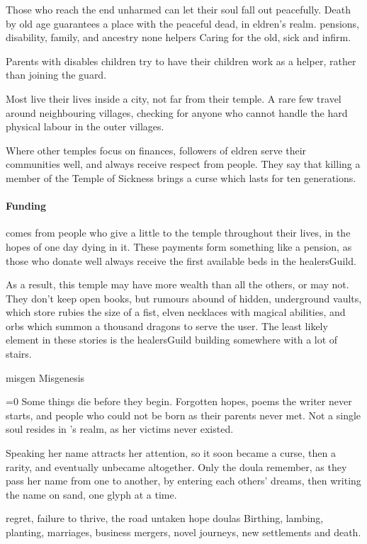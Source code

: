 \begin{multicols}{2}
{    Those who reach the end unharmed can let their soul fall out peacefully.
    Death by old age guarantees a place with the peaceful dead, in \gls{eldren}'s realm.
  }%
  {pensions, disability, family, and ancestry}%
  {none}%
  {\Glspl{helper}}%
  {
    Caring for the old, sick and infirm.
  }%

Parents with disables children try to have their children work as a helper, rather than joining the \gls{guard}.

Most live their lives inside a city, not far from their temple.
A rare few travel around neighbouring \glspl{village}, checking for anyone who cannot handle the hard physical labour in the outer \glspl{village}.

Where other temples focus on finances, followers of \gls{eldren} serve their communities well, and always receive respect from people.
They say that killing a member of the Temple of Sickness brings a curse which lasts for ten generations.

\paragraph{Funding}
comes from people who give a little to the temple throughout their lives, in the hopes of one day dying in it.
These payments form something like a pension, as those who donate well always receive the first available beds in the \gls{healersGuild}.

As a result, this temple may have more wealth than all the others, or may not.
They don't keep open books, but rumours abound of hidden, underground vaults, which store rubies the size of a fist, elven necklaces with magical abilities, and orbs which summon a thousand dragons to serve the user.
The least likely element in these stories is the \gls{healersGuild} building somewhere with a lot of stairs.

\guild{\hphantom{Nulla}}%
  {\gls{misgen}}%
  {Misgenesis}%
  {
  \ifnum\value{temperature}=0\fi
  Some things die before they begin.
  Forgotten hopes, poems the writer never starts, and people who could not be born as their parents never met.
  Not a single soul resides in \hphantom{Nulla}'s realm, as her victims never existed.

  Speaking her name attracts her attention, so it soon became a curse, then a rarity, and eventually unbecame altogether.
  Only the doula remember, as they pass her name from one to another, by entering each others' dreams, then writing the name on sand, one glyph at a time.
  }%
  {regret, failure to thrive, the road untaken}%
  {hope}%
  {\Glspl{doula}}%
  {
    Birthing, lambing, planting, marriages, business mergers, novel journeys, new settlements and death.
  }%


\end{multicols}
